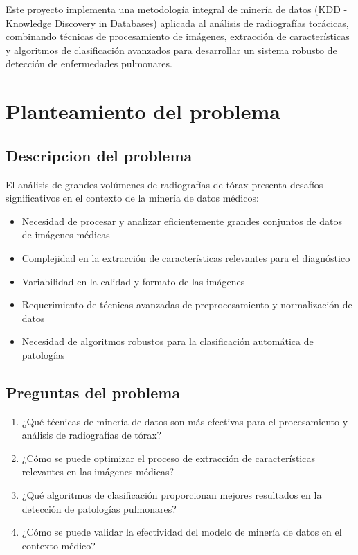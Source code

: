 \documentclass[conference]{IEEEtran}
\begin{document}
Este proyecto implementa una metodología integral de minería de datos (KDD - Knowledge Discovery in Databases) aplicada al análisis de radiografías torácicas, combinando técnicas de procesamiento de imágenes, extracción de características y algoritmos de clasificación avanzados para desarrollar un sistema robusto de detección de enfermedades pulmonares.

\section{Planteamiento del problema}
\subsection{Descripcion del problema}
El análisis de grandes volúmenes de radiografías de tórax presenta desafíos significativos en el contexto de la minería de datos médicos:

\begin{itemize}
    \item Necesidad de procesar y analizar eficientemente grandes conjuntos de datos de imágenes médicas
    \item Complejidad en la extracción de características relevantes para el diagnóstico
    \item Variabilidad en la calidad y formato de las imágenes
    \item Requerimiento de técnicas avanzadas de preprocesamiento y normalización de datos
    \item Necesidad de algoritmos robustos para la clasificación automática de patologías
\end{itemize}

\subsection{Preguntas del problema}
\begin{enumerate}
    \item ¿Qué técnicas de minería de datos son más efectivas para el procesamiento y análisis de radiografías de tórax?
    \item ¿Cómo se puede optimizar el proceso de extracción de características relevantes en las imágenes médicas?
    \item ¿Qué algoritmos de clasificación proporcionan mejores resultados en la detección de patologías pulmonares?
    \item ¿Cómo se puede validar la efectividad del modelo de minería de datos en el contexto médico?
\end{enumerate}
\end{document}
